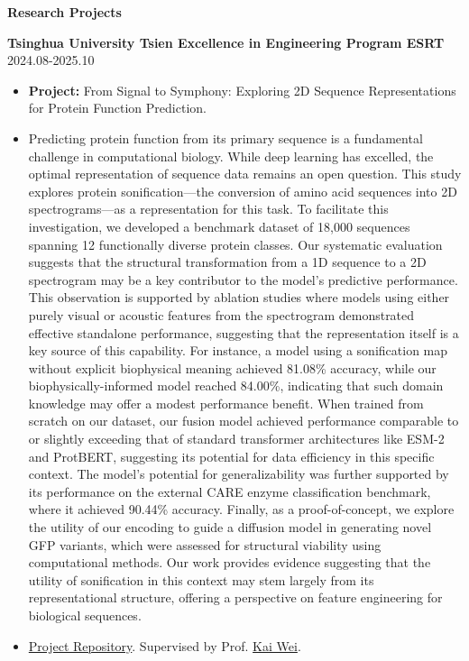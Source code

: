 \documentclass[11pt]{article}
\begin{document}
	\begin{center}
		\textbf{\large Research Projects}
	\end{center}
	\textbf{Tsinghua University Tsien Excellence in Engineering Program ESRT} \hfill 2024.08-2025.10
	\begin{itemize}[noitemsep, topsep=0pt, partopsep=0pt, parsep=0pt, leftmargin=*]
		\item \textbf{Project:} From Signal to Symphony: Exploring 2D Sequence Representations for Protein Function Prediction.
		\item {\small Predicting protein function from its primary sequence is a fundamental challenge in computational biology. While deep learning has excelled, the optimal representation of sequence data remains an open question. This study explores protein sonification---the conversion of amino acid sequences into 2D spectrograms---as a representation for this task. To facilitate this investigation, we developed a benchmark dataset of 18,000 sequences spanning 12 functionally diverse protein classes. Our systematic evaluation suggests that the structural transformation from a 1D sequence to a 2D spectrogram may be a key contributor to the model's predictive performance. This observation is supported by ablation studies where models using either purely visual or acoustic features from the spectrogram demonstrated effective standalone performance, suggesting that the representation itself is a key source of this capability. For instance, a model using a sonification map without explicit biophysical meaning achieved 81.08\% accuracy, while our biophysically-informed model reached 84.00\%, indicating that such domain knowledge may offer a modest performance benefit. When trained from scratch on our dataset, our fusion model achieved performance comparable to or slightly exceeding that of standard transformer architectures like ESM-2 and ProtBERT, suggesting its potential for data efficiency in this specific context. The model's potential for generalizability was further supported by its performance on the external CARE enzyme classification benchmark, where it achieved 90.44\% accuracy. Finally, as a proof-of-concept, we explore the utility of our encoding to guide a diffusion model in generating novel GFP variants, which were assessed for structural viability using computational methods. Our work provides evidence suggesting that the utility of sonification in this context may stem largely from its representational structure, offering a perspective on feature engineering for biological sequences.}
		\item \href{https://github.com/wyqmath/Symphony_of_Fate}{Project Repository}. Supervised by Prof. \href{https://scholar.google.com/citations?user=LLj__mMAAAAJ}{Kai Wei}.
	\end{itemize}
\end{document}
